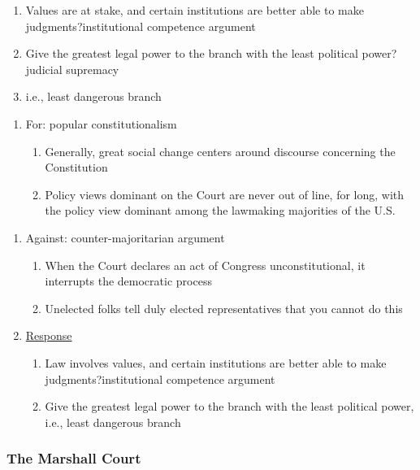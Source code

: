 \begin{enumerate}
\begin {enumerate}
\begin{enumerate}
\begin{enumerate}
					\item Values are at stake, and certain institutions are better able to make judgments?institutional competence argument
					\item Give the greatest legal power to the branch with the least political power?judicial supremacy
							\item i.e., least dangerous branch
							\end{enumerate}
						\end{enumerate}
					\begin{enumerate}
						\item For: popular constitutionalism
							\begin{enumerate}
								\item Generally, great social change centers around discourse concerning the Constitution
								\item Policy views dominant on the Court are never out of line, for long, with the policy view dominant among the lawmaking majorities of the U.S.
							\end{enumerate}
						\end{enumerate}
					\begin{enumerate}
						\item Against: counter-majoritarian argument 
						\begin{enumerate} 
							\item When the Court declares an act of Congress unconstitutional, it interrupts the democratic process
							\item Unelected folks tell duly elected representatives that you cannot do this
\end{enumerate}
							\item \underline{Response}
\begin{enumerate}
							\item Law involves values, and certain institutions are better able to make judgments?institutional competence argument
\item Give the greatest legal power to the branch with the least political power, i.e., least dangerous branch
\end{enumerate}
\end{enumerate}
\end{enumerate}

\subsubsection{The Marshall Court}


\end{enumerate}
